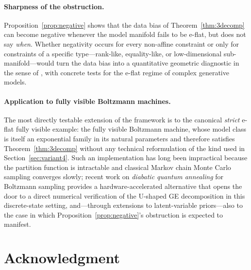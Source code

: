 \documentclass[11pt,a4paper]{article}
\theoremstyle{definition}
\theoremstyle{remark}
\begin{document}
\paragraph{Sharpness of the obstruction.}
Proposition~\ref{prop:negative} shows that the data bias of
Theorem~\ref{thm:3decomp} can become negative whenever the
model manifold fails to be e-flat, but does not say
\emph{when}. Whether negativity occurs for every non-affine
constraint or only for constraints of a specific
type---rank-like, equality-like, or low-dimensional
sub-manifold---would turn the data bias into a quantitative
geometric diagnostic in the sense of
\cite{Watanabe2010,Grunwald2007MDL}, with concrete tests for
the e-flat regime of complex generative models.

\paragraph{Application to fully visible Boltzmann machines.}
The most directly testable extension of the framework is to the
canonical \emph{strict} e-flat fully visible example: the fully
visible Boltzmann machine, whose model class is itself an
exponential family in its natural parameters and therefore
satisfies Theorem~\ref{thm:3decomp} without any technical
reformulation of the kind used in Section~\ref{sec:variant4}.
Such an implementation has long been impractical because the
partition function is intractable and classical Markov chain
Monte Carlo sampling converges slowly; recent work on
\emph{diabatic quantum annealing} for Boltzmann sampling
\cite{Gyhm2024DQABoltzmann} provides a hardware-accelerated
alternative that opens the door to a direct numerical
verification of the U-shaped GE decomposition in this
discrete-state setting, and---through extensions to
latent-variable priors---also to the case in which
Proposition~\ref{prop:negative}'s obstruction is expected to
manifest.

\section*{Acknowledgment}
%



\end{document}
